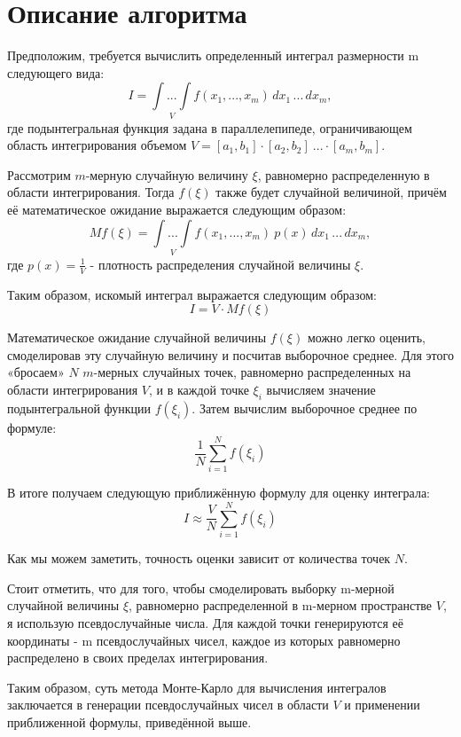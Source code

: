 \documentclass{report}
\begin{document}
\section*{Описание алгоритма}
\par Предположим, требуется вычислить определенный интеграл размерности m следующего вида:
$$I = \underset{V}{\int ... \int} f(x_1, ... , x_m) \,dx_1\,...\,dx_m, $$
где подынтегральная функция задана в параллелепипеде, ограничивающем область интегрирования объемом $V=[a_1,b_1] \cdot [a_2,b_2]\ ... \cdot [a_m,b_m]$.
\par Рассмотрим $m$-мерную случайную величину $\xi$,  равномерно распределенную в области интегрирования. Тогда $f(\xi)$ также будет случайной величиной, причём её математическое ожидание выражается следующим образом:
$$Mf(\xi) = \underset{V}{\int ... \int} f(x_1, ... , x_m) \ p(x) \,dx_1\,...\,dx_m, $$
где $p(x)=\frac{1}{V}$ - плотность распределения случайной величины $\xi.$
\par Таким образом, искомый интеграл выражается следующим образом:
$$I = V \cdot Mf(\xi)$$
\par Математическое ожидание случайной величины $f(\xi)$ можно легко оценить, смоделировав эту случайную величину и посчитав выборочное среднее. Для этого «бросаем» $N$ $m$-мерных случайных точек, равномерно распределенных на области интегрирования $V$, и в каждой точке $\xi_i$ вычисляем значение подынтегральной функции $f(\xi_i)$. Затем вычислим выборочное среднее по формуле:
$$\frac{1}{N}\sum\limits_{i=1}^N f(\xi_i)$$
\par В итоге получаем следующую приближённую формулу для оценку интеграла:
$$I\approx\frac{V}{N}\sum\limits_{i=1}^N f(\xi_i)$$
\par Как мы можем заметить, точность оценки зависит от количества точек $N$.
\par Стоит отметить, что для того, чтобы смоделировать выборку m-мерной случайной величины $\xi$, равномерно распределенной в m-мерном пространстве $V$, я использую псевдослучайные числа. Для каждой точки генерируются её координаты - m псевдослучайных чисел, каждое из которых равномерно распределено в своих пределах интегрирования.
\par Таким образом, суть метода Монте-Карло для вычисления интегралов заключается в генерации псевдослучайных чисел в области $V$ и применении приближенной формулы, приведённой выше.
\newpage

\end{document}
